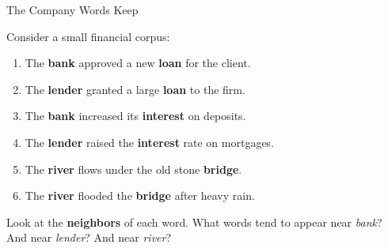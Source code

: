 \documentclass[aspectratio=169]{beamer}
\begin{document}
%
%
\begin{frame}{The Company Words Keep}


Consider a small financial corpus:

\begin{tcolorbox}[colback=gray!6, colframe=gray!50,
  fontupper=\small]
\begin{enumerate}
\item The \textbf{bank} approved a new \textbf{loan} for the client.
\item The \textbf{lender} granted a large \textbf{loan} to the firm.
\item The \textbf{bank} increased its \textbf{interest} on deposits.
\item The \textbf{lender} raised the \textbf{interest} rate on mortgages.
\item The \textbf{river} flows under the old stone \textbf{bridge}.
\item The \textbf{river} flooded the \textbf{bridge} after heavy rain.
\end{enumerate}
\end{tcolorbox}

\vspace{0.3cm}
Look at the \textbf{neighbors} of each word.
What words tend to appear near \emph{bank}?
And near \emph{lender}?  And near \emph{river}?

\end{frame}
%
%
\end{document}
